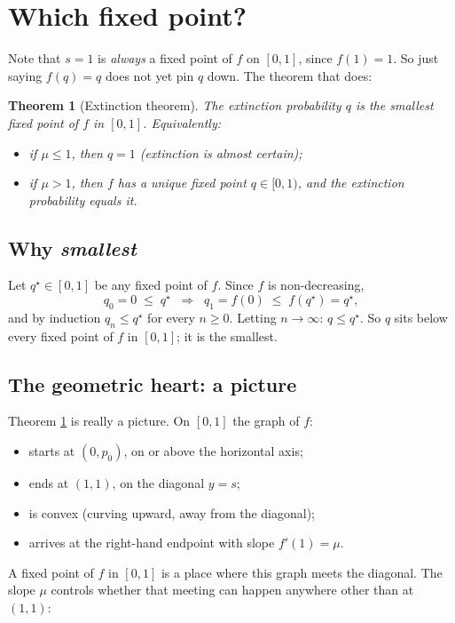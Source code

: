 \documentclass[11pt]{article}
\newtheorem{theorem}{Theorem}
\begin{document}
\section{Which fixed point?}
Note that $s = 1$ is \emph{always} a fixed point of $f$ on $[0,1]$, since $f(1) = 1$. So just saying $f(q) = q$ does not yet pin $q$ down. The theorem that does:

\begin{theorem}[Extinction theorem]\label{thm:ext}
The extinction probability $q$ is the \emph{smallest} fixed point of $f$ in $[0, 1]$. Equivalently:
\begin{itemize}[leftmargin=*, itemsep=2pt]
  \item if $\mu \leq 1$, then $q = 1$ (extinction is almost certain);
  \item if $\mu > 1$, then $f$ has a unique fixed point $q \in [0, 1)$, and the extinction probability equals it.
\end{itemize}
\end{theorem}

\subsection*{Why \emph{smallest}}
Let $q^\star \in [0,1]$ be any fixed point of $f$. Since $f$ is non-decreasing,
\[
q_0 = 0 \;\leq\; q^\star \;\;\Longrightarrow\;\; q_1 = f(0) \;\leq\; f(q^\star) = q^\star,
\]
and by induction $q_n \leq q^\star$ for every $n \geq 0$. Letting $n \to \infty$: $q \leq q^\star$. So $q$ sits below every fixed point of $f$ in $[0,1]$; it is the smallest.

\subsection*{The geometric heart: a picture}
Theorem \ref{thm:ext} is really a picture. On $[0,1]$ the graph of $f$:
\begin{itemize}[leftmargin=*, itemsep=2pt]
  \item starts at $(0, p_0)$, on or above the horizontal axis;
  \item ends at $(1, 1)$, on the diagonal $y = s$;
  \item is convex (curving upward, away from the diagonal);
  \item arrives at the right-hand endpoint with slope $f'(1) = \mu$.
\end{itemize}
A fixed point of $f$ in $[0,1]$ is a place where this graph meets the diagonal. The slope $\mu$ controls whether that meeting can happen anywhere other than at $(1,1)$:
\end{document}
